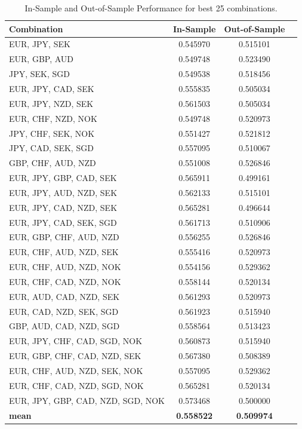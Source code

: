 \begin{table}[h!]
  \centering
  \begin{tabular}{lccc}
    \hline
    Combination & In-Sample & Out-of-Sample \\
    \hline
    EUR, JPY, SEK & 0.545970 & 0.515101 \\
    EUR, GBP, AUD & 0.549748 & 0.523490 \\
    JPY, SEK, SGD & 0.549538 & 0.518456 \\
    EUR, JPY, CAD, SEK & 0.555835 & 0.505034 \\
    EUR, JPY, NZD, SEK & 0.561503 & 0.505034 \\
    EUR, CHF, NZD, NOK & 0.549748 & 0.520973 \\
    JPY, CHF, SEK, NOK & 0.551427 & 0.521812 \\
    JPY, CAD, SEK, SGD & 0.557095 & 0.510067 \\
    GBP, CHF, AUD, NZD & 0.551008 & 0.526846 \\
    EUR, JPY, GBP, CAD, SEK & 0.565911 & 0.499161 \\
    EUR, JPY, AUD, NZD, SEK & 0.562133 & 0.515101 \\
    EUR, JPY, CAD, NZD, SEK & 0.565281 & 0.496644 \\
    EUR, JPY, CAD, SEK, SGD & 0.561713 & 0.510906 \\
    EUR, GBP, CHF, AUD, NZD & 0.556255 & 0.526846 \\
    EUR, CHF, AUD, NZD, SEK & 0.555416 & 0.520973 \\
    EUR, CHF, AUD, NZD, NOK & 0.554156 & 0.529362 \\
    EUR, CHF, CAD, NZD, NOK & 0.558144 & 0.520134 \\
    EUR, AUD, CAD, NZD, SEK & 0.561293 & 0.520973 \\
    EUR, CAD, NZD, SEK, SGD & 0.561923 & 0.515940 \\
    GBP, AUD, CAD, NZD, SGD & 0.558564 & 0.513423 \\
    EUR, JPY, CHF, CAD, SGD, NOK & 0.560873 & 0.515940 \\
    EUR, GBP, CHF, CAD, NZD, SEK & 0.567380 & 0.508389 \\
    EUR, CHF, AUD, NZD, SEK, NOK & 0.557095 & 0.529362 \\
    EUR, CHF, CAD, NZD, SGD, NOK & 0.565281 & 0.520134 \\
    EUR, JPY, GBP, CAD, NZD, SGD, NOK & 0.573468 & 0.500000 \\
    \hline
    \textbf{mean}  & \textbf{0.558522} & \textbf{0.509974}
  \end{tabular}
  \caption{In-Sample and Out-of-Sample Performance for best 25 combinations. }
  \label{tab:combination_performance}
\end{table}

